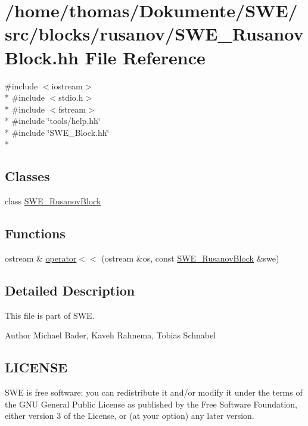 \hypertarget{SWE__RusanovBlock_8hh}{\section{/home/thomas/\-Dokumente/\-S\-W\-E/src/blocks/rusanov/\-S\-W\-E\-\_\-\-Rusanov\-Block.hh File Reference}
\label{SWE__RusanovBlock_8hh}
}
{\ttfamily \#include $<$iostream$>$}\\*
{\ttfamily \#include $<$stdio.\-h$>$}\\*
{\ttfamily \#include $<$fstream$>$}\\*
{\ttfamily \#include \char`\"{}tools/help.\-hh\char`\"{}}\\*
{\ttfamily \#include \char`\"{}S\-W\-E\-\_\-\-Block.\-hh\char`\"{}}\\*
\subsection*{Classes}
\begin{DoxyCompactItemize}
\item 
class \hyperlink{classSWE__RusanovBlock}{S\-W\-E\-\_\-\-Rusanov\-Block}
\end{DoxyCompactItemize}
\subsection*{Functions}
\begin{DoxyCompactItemize}
\item 
ostream \& \hyperlink{SWE__RusanovBlock_8hh_a11f96afabd5e590e50d491568b96503a}{operator$<$$<$} (ostream \&os, const \hyperlink{classSWE__RusanovBlock}{S\-W\-E\-\_\-\-Rusanov\-Block} \&swe)
\end{DoxyCompactItemize}


\subsection{Detailed Description}
This file is part of S\-W\-E.

\begin{DoxyAuthor}{Author}
Michael Bader, Kaveh Rahnema, Tobias Schnabel
\end{DoxyAuthor}
\hypertarget{Writer_8hh_LICENSE}{}\subsection{L\-I\-C\-E\-N\-S\-E}\label{Writer_8hh_LICENSE}
S\-W\-E is free software\-: you can redistribute it and/or modify it under the terms of the G\-N\-U General Public License as published by the Free Software Foundation, either version 3 of the License, or (at your option) any later version.

